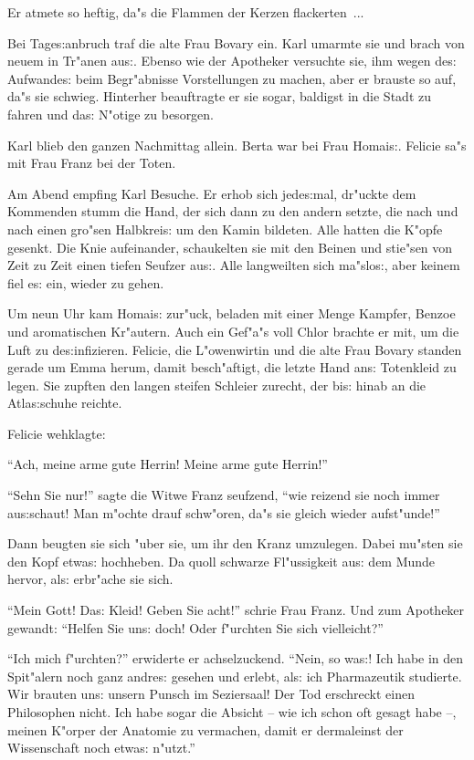 \documentclass[oneside,12pt]{book}
\newcommand{\s}{s:}%
\begin{document}
Er atmete so heftig, da"s die Flammen der Kerzen flackerten~...

Bei Tage{\s}anbruch traf die alte Frau Bovary ein. Karl umarmte
sie und brach von neuem in Tr"anen au{\s}. Ebenso wie der
Apotheker versuchte sie, ihm wegen de{\s} Aufwande{\s} beim
Begr"abnisse Vorstellungen zu machen, aber er brauste so auf, da"s
sie schwieg. Hinterher beauftragte er sie sogar, baldigst in die
Stadt zu fahren und da{\s} N"otige zu besorgen.

Karl blieb den ganzen Nachmittag allein. Berta war bei Frau
Homai{\s}. Felicie sa"s mit Frau Franz bei der Toten.

Am Abend empfing Karl Besuche. Er erhob sich jede{\s}mal, dr"uckte
dem Kommenden stumm die Hand, der sich dann zu den andern setzte,
die nach und nach einen gro"sen Halbkrei{\s} um den Kamin
bildeten. Alle hatten die K"opfe gesenkt. Die Knie aufeinander,
schaukelten sie mit den Beinen und stie"sen von Zeit zu Zeit einen
tiefen Seufzer au{\s}. Alle langweilten sich ma"slo{\s}, aber
keinem fiel e{\s} ein, wieder zu gehen.

Um neun Uhr kam Homai{\s} zur"uck, beladen mit einer Menge
Kampfer, Benzoe und aromatischen Kr"autern. Auch ein Gef"a"s voll
Chlor brachte er mit, um die Luft zu de{\s}infizieren. Felicie,
die L"owenwirtin und die alte Frau Bovary standen gerade um Emma
herum, damit besch"aftigt, die letzte Hand an{\s} Totenkleid zu
legen. Sie zupften den langen steifen Schleier zurecht, der bi{\s}
hinab an die Atla{\s}schuhe reichte.

Felicie wehklagte:

"`Ach, meine arme gute Herrin! Meine arme gute Herrin!"'

"`Sehn Sie nur!"' sagte die Witwe Franz seufzend, "`wie reizend
sie noch immer au{\s}schaut! Man m"ochte drauf schw"oren, da"s sie
gleich wieder aufst"unde!"'

Dann beugten sie sich "uber sie, um ihr den Kranz umzulegen. Dabei
mu"sten sie den Kopf etwa{\s} hochheben. Da quoll schwarze
Fl"ussigkeit au{\s} dem Munde hervor, al{\s} erbr"ache sie sich.

"`Mein Gott! Da{\s} Kleid! Geben Sie acht!"' schrie Frau Franz.
Und zum Apotheker gewandt: "`Helfen Sie un{\s} doch! Oder
f"urchten Sie sich vielleicht?"'

"`Ich mich f"urchten?"' erwiderte er achselzuckend. "`Nein, so
wa{\s}! Ich habe in den Spit"alern noch ganz andre{\s} gesehen und
erlebt, al{\s} ich Pharmazeutik studierte. Wir brauten un{\s}
unsern Punsch im Seziersaal! Der Tod erschreckt einen Philosophen
nicht. Ich habe sogar die Absicht -- wie ich schon oft gesagt habe
--, meinen K"orper der Anatomie zu vermachen, damit er dermaleinst
der Wissenschaft noch etwa{\s} n"utzt."'
\end{document}
